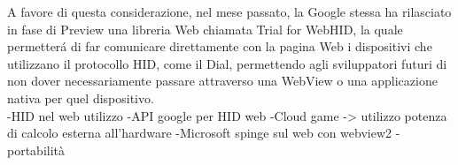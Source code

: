 A favore di questa considerazione, nel mese passato, la Google stessa ha rilasciato in fase di Preview una libreria Web chiamata Trial for WebHID, la quale permetterá di far comunicare direttamente con la pagina Web i dispositivi che utilizzano il protocollo HID, come il Dial, permettendo agli sviluppatori futuri di non dover necessariamente passare attraverso una WebView o una applicazione nativa per quel dispositivo.\\

-HID nel web utilizzo
-API google per HID web
-Cloud game -> utilizzo potenza di calcolo esterna all'hardware
-Microsoft spinge sul web con webview2
-portabilità






